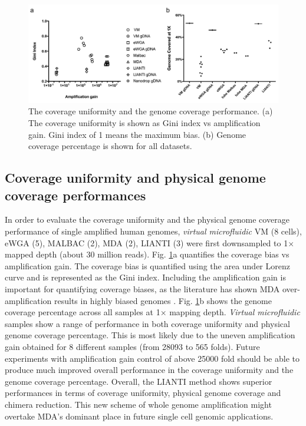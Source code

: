 \begin{figure}
\centering
\includegraphics[keepaspectratio,width=1\textwidth]{./figures/GenomecovLorenz}
\caption[The coverage uniformity and the genome coverage performance]{The coverage uniformity and the genome coverage performance. (a) The coverage uniformity is shown as Gini index vs amplification gain. Gini index of 1 means the maximum bias. (b) Genome coverage percentage is shown for all datasets.}
\label{fig:GenomecovLorenz}
\end{figure}

\subsection{Coverage uniformity and physical genome coverage performances}
In order to evaluate the coverage uniformity and the physical genome coverage performance of single amplified human genomes, \textit{virtual microfluidic} VM (8 cells), eWGA (5), MALBAC (2), MDA (2), LIANTI (3) were first downsampled to 1$\times$ mapped depth (about 30 million reads). Fig. \ref{fig:GenomecovLorenz}a quantifies the coverage bias vs amplification gain. The coverage bias is quantified using the area under Lorenz curve and is represented as the Gini index. Including the amplification gain is important for quantifying coverage biases, as the literature has shown MDA over-amplification results in highly biased genomes \cite{deBourcy:2014ji}. Fig. \ref{fig:GenomecovLorenz}b shows the genome coverage percentage across all samples at 1$\times$ mapping depth. \textit{Virtual microfluidic} samples show a range of performance in both coverage uniformity and physical genome coverage percentage. This is most likely due to the uneven amplification gain obtained for 8 different samples (from 28093 to 565 folds). Future experiments with amplification gain control of above 25000 fold should be able to produce much improved overall performance in the coverage uniformity and the genome coverage percentage. Overall, the LIANTI method shows superior performances in terms of coverage uniformity, physical genome coverage and chimera reduction. This new scheme of whole genome amplification might overtake MDA's dominant place in future single cell genomic applications. 

